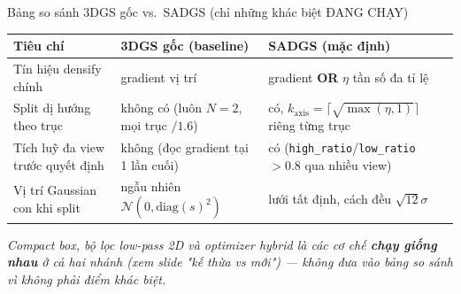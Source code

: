 \begin{frame}{Bảng so sánh 3DGS gốc vs.\ SADGS (chỉ những khác biệt ĐANG CHẠY)}
\scriptsize
\begin{center}
\begin{tabular}{p{4.6cm}p{3.6cm}p{4.4cm}}
\toprule
\textbf{Tiêu chí} & \textbf{3DGS gốc (baseline)} & \textbf{SADGS (mặc định)}\\
\midrule
Tín hiệu densify chính & gradient vị trí & gradient \textbf{OR} $\eta$ tần số đa tỉ lệ\\
Split dị hướng theo trục & không có (luôn $N{=}2$, mọi trục $/1.6$) & có, $k_{\text{axis}}=\lceil\sqrt{\max(\eta,1)}\rceil$ riêng từng trục\\
Tích luỹ đa view trước quyết định & không (đọc gradient tại 1 lần cuối) & có (\texttt{high\_ratio}/\texttt{low\_ratio}$>0.8$ qua nhiều view)\\
Vị trí Gaussian con khi split & ngẫu nhiên $\mathcal{N}(0,\mathrm{diag}(s)^2)$ & lưới tất định, cách đều $\sqrt{12}\sigma$\\
\bottomrule
\end{tabular}
\end{center}
\footnotesize\textit{Compact box, bộ lọc low-pass 2D và optimizer hybrid là các cơ chế \textbf{chạy giống nhau} ở cả hai
nhánh (xem slide "kế thừa vs mới") --- không đưa vào bảng so sánh vì không phải điểm khác biệt.}
\end{frame}

